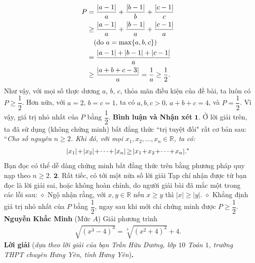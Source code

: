 \begin{multicols}{2}
	\begin{align*}
			P &= \dfrac{{\left| {a - 1} \right|}}{a} + \dfrac{{\left| {b - 1} \right|}}{b} + \dfrac{{\left| {c - 1} \right|}}{c} \\
			&\ge \dfrac{{\left| {a - 1} \right|}}{a} + \dfrac{{\left| {b - 1} \right|}}{a} + \dfrac{{\left| {c - 1} \right|}}{a}\\
			&\quad({\text{\color{black} do } } a = \max \{ a,b,c\} )\\
			 &= \dfrac{{\left| {a - 1} \right| + \left| {b - 1} \right| + \left| {c - 1} \right|}}{a} \\
			 &\ge \dfrac{{\left| {a + b + c - 3} \right|}}{a} = \dfrac{1}{a} \ge \dfrac{1}{2}.
	\end{align*}
	Như vậy, với mọi số thực dương $a$, $b$, $c$, thỏa mãn điều kiện của đề bài, ta luôn có  $P \ge \dfrac{1}{2}$.
	\vskip 0.05cm
	Hơn nữa, với $a \!=\! 2$, $b \!=\! c \!=\! 1$, ta có $a, b, c \!>\! 0$, $a + b + c = 4$, và  $P = \dfrac{1}{2}$.
	\vskip 0.05cm
	Vì vậy, giá trị nhỏ nhất của $P$ bằng  $\dfrac{1}{2}$.
	\vskip 0.05cm
	\textbf{\color{thachthuctoanhoc}Bình luận và Nhận xét}
	\vskip 0.05cm
	$\pmb{1.}$ Ở lời giải trên, ta đã sử dụng (không chứng minh) bất đẳng thức ``trị tuyệt đối" rất cơ bản sau:
	\vskip 0.05cm
	``\textit{Cho số nguyên $n \ge 2$. Khi đó, với mọi  $x_1, x_2, \ldots,x_n \in \mathbb{R}$, ta có:}
	\begin{align*}
		|{x_1}| \!+\! |{x_2}| \!+\!  \cdots  \!+\! |{x_n}| \!\ge\! |{x_1} \!+\! {x_2} \!+\!  \cdots  \!+\! {x_n}|. \text{\color{black}"}
	\end{align*}
	Bạn đọc có thể dễ dàng chứng minh bất đẳng thức trên bằng phương pháp quy nạp theo $n \ge 2$.
	\vskip 0.05cm
	$\pmb{2.}$ Rất tiếc, có tới một nửa số lời giải Tạp chí nhận được từ bạn đọc là lời giải sai, hoặc không hoàn chỉnh, do người giải bài đã mắc một trong các lỗi sau:
	\vskip 0.05cm
	$\diamond$ Ngộ nhận rằng, với  $x,y \in \mathbb{R}$ nếu $x \ge y$ thì $|x|\ge |y|$.
	\vskip 0.05cm 
	$\diamond$ Khẳng định giá trị nhỏ nhất của $P$ bằng  $\dfrac{1}{2}$, ngay sau khi mới chỉ chứng minh được  $P \ge \dfrac{1}{2}$.
	\vskip 0.05cm
	\hfill	\textbf{\color{thachthuctoanhoc}Nguyễn Khắc Minh}
	\vskip 0.05cm
	{}
	(Mức $A$) Giải phương trình
	\begin{align*}
		\sqrt{(x^3-4)^3}=\sqrt[3]{(x^2+4)^2}+4.
	\end{align*} 
	\textbf{\color{thachthuctoanhoc}Lời giải} (\textit{dựa theo lời giải của bạn Trần Hữu Dương, lớp $10$ Toán $1$, trường THPT chuyên Hưng Yên, tỉnh Hưng Yên})\textbf{\color{thachthuctoanhoc}.}

\end{multicols}
